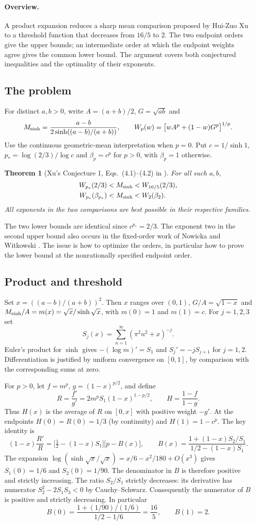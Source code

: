 \documentclass[11pt,a4paper]{article}
\newtheorem*{SourceRcdStheorem}{Theorem}
\begin{document}
\paragraph{Overview.}
A product expansion reduces a sharp mean comparison proposed by Hui-Zuo Xu to a threshold function that decreases from $16/5$ to $2$. The two endpoint orders give the upper bounds; an intermediate order at which the endpoint weights agree gives the common lower bound. The argument covers both conjectured inequalities and the optimality of their exponents.


\subsection*{The problem}
For distinct $a,b>0$, write $A=(a+b)/2$, $G=\sqrt{ab}$ and
\[
 M_{\sinh}=\frac{a-b}{2\sinh((a-b)/(a+b))},\qquad
 W_p(w)=\big[w A^p+(1-w)G^p\big]^{1/p}.
\]
Use the continuous geometric-mean interpretation when $p=0$. Put $c=1/\sinh 1$, $p_*=\log(2/3)/\log c$ and $\beta_p=c^p$ for $p>0$, with $\beta_p=1$ otherwise.
\begin{SourceRcdStheorem}[Xu's Conjecture 1, Eqs.\ (4.1)--(4.2) in \cite{R23S:xu}]
For all such $a,b$,
\begin{align*}
 W_{p_*}(2/3)&<M_{\sinh}<W_{16/5}(2/3),\\
 W_{p_*}(\beta_{p_*})&<M_{\sinh}<W_2(\beta_2).
\end{align*}
All exponents in the two comparisons are best possible in their respective families.
\end{SourceRcdStheorem}
The two lower bounds are identical since $c^{p_*}=2/3$. The exponent two in the second upper bound also occurs in the fixed-order work of Nowicka and Witkowski \cite{R23S:nw}. The issue is how to optimize the orders, in particular how to prove the lower bound at the nonrationally specified endpoint order.
\subsection*{Product and threshold}
Set $x=((a-b)/(a+b))^2$. Then $x$ ranges over $(0,1)$,
$G/A=\sqrt{1-x}$ and $M_{\sinh}/A=m(x)=\sqrt x/\sinh\sqrt x$, with $m(0)=1$ and $m(1)=c$.
For $j=1,2,3$ set
\[
 S_j(x)=\sum_{n=1}^\infty(\pi^2 n^2+x)^{-j}.
\]
Euler's product for $\sinh$ \cite{R23S:nist} gives $-(\log m)'=S_1$ and $S_j'=-jS_{j+1}$ for $j=1,2$. Differentiation is justified by uniform convergence on $[0,1]$, by comparison with the corresponding sums at zero.

For $p>0$, let $f=m^p$, $g=(1-x)^{p/2}$, and define
\[
 R=\frac{f'}{g'}=2m^pS_1(1-x)^{1-p/2},\qquad H=\frac{1-f}{1-g}.
\]
Thus $H(x)$ is the average of $R$ on $[0,x]$ with positive weight $-g'$.
At the endpoints $H(0)=R(0)=1/3$ (by continuity) and $H(1)=1-c^p$.
The key identity is
\[
 (1-x)\frac{R'}R=
 \big[\tfrac12-(1-x)S_1\big]\big[p-B(x)\big],\qquad
 B(x)=\frac{1+(1-x)S_2/S_1}{1/2-(1-x)S_1}.
\]
The expansion $\log(\sinh\sqrt x/\sqrt x)=x/6-x^2/180+O(x^3)$ gives $S_1(0)=1/6$ and $S_2(0)=1/90$. The denominator in $B$ is therefore positive and strictly increasing. The ratio $S_2/S_1$ strictly decreases: its derivative has numerator $S_2^2-2S_1S_3<0$ by Cauchy--Schwarz. Consequently the numerator of $B$ is positive and strictly decreasing. In particular
\[
 B(0)=\frac{1+(1/90)/(1/6)}{1/2-1/6}=\frac{16}{5},\qquad B(1)=2.
\]
\end{document}
